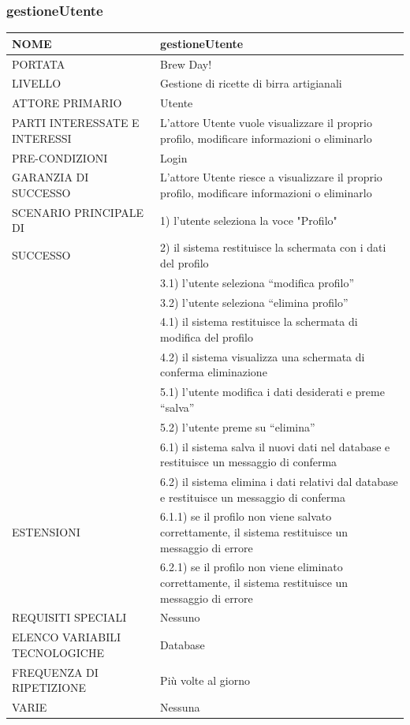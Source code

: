 \documentclass[a4paper, titlepage]{article}
\begin{document}
\subsubsection{gestioneUtente}
\begin{longtable}{p{6cm}p{7cm}}\toprule
    NOME & gestioneUtente\\\midrule
    PORTATA & Brew Day!\\\midrule
    LIVELLO & Gestione di ricette di birra artigianali\\\midrule
    ATTORE PRIMARIO & Utente\\\midrule
    PARTI INTERESSATE E INTERESSI & L’attore Utente vuole visualizzare il proprio profilo, modificare informazioni o eliminarlo\\\midrule
    PRE-CONDIZIONI & Login\\\midrule
    GARANZIA DI SUCCESSO & L’attore Utente riesce a visualizzare il proprio profilo, modificare informazioni o eliminarlo\\\midrule
    SCENARIO PRINCIPALE DI
    & 1) l’utente seleziona la voce "Profilo"\\
    SUCCESSO & 2) il sistema restituisce la schermata con i dati del profilo\\
    & 3.1) l’utente seleziona “modifica profilo”\\
    & 3.2) l’utente seleziona “elimina profilo”\\
    & 4.1) il sistema restituisce la schermata di modifica del profilo\\
    & 4.2) il sistema visualizza una schermata di conferma eliminazione\\
    & 5.1) l’utente modifica i dati desiderati e preme “salva”\\
    & 5.2) l’utente preme su “elimina”\\
    & 6.1) il sistema salva il nuovi dati nel database e restituisce un messaggio di conferma\\
    & 6.2) il sistema elimina i dati relativi dal database e restituisce un messaggio di conferma\\\midrule
    ESTENSIONI
    & 6.1.1) se il profilo non viene salvato correttamente, il sistema restituisce un messaggio di errore\\
    & 6.2.1) se il profilo non viene eliminato correttamente, il sistema restituisce un messaggio di errore\\\midrule
    REQUISITI SPECIALI & Nessuno\\\midrule
    ELENCO VARIABILI TECNOLOGICHE & Database\\\midrule
    FREQUENZA DI RIPETIZIONE & Più volte al giorno\\\midrule
    VARIE & Nessuna\\\bottomrule
\end{longtable}
\vphantom{}
\newpage
\end{document}
